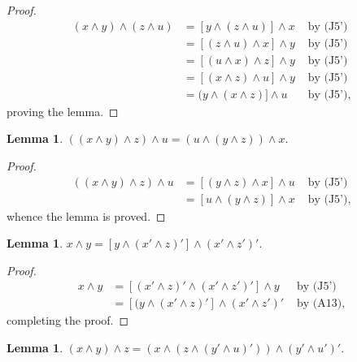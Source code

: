 \documentclass{amsart}
\theoremstyle{plain}
\newtheorem{lemma}[theorem]{Lemma}
\theoremstyle{problem}
\theoremstyle{definition}
\theoremstyle{remark}
\numberwithin{equation}{section}
\begin{document}
\begin{proof}
\begin{align*}                                                            
(x \land y) \land (z \land u)  &= [y \land (z \land u)] \land x &\text{  by (J5')}\\
                                            &= [(z \land u) \land x] \land y  &\text{  by (J5')}\\
                                            &=[(u \land x) \land z] \land y  &\text{  by (J5')}\\
                                            &=[(x \land z)\land u] \land y  &\text{  by (J5')}\\
                                            & =(y \land (x \land z)] \land u &\text{  by (J5')},
\end{align*} 
proving the lemma.                                              
\end{proof}


\begin{lemma} \label{108}
 $((x \land y) \land z) \land u = (u \land (y \land z)) \land x.$  
 \end{lemma}
 
\begin{proof} 
\begin{align*}                                                                 
 ((x \land y) \land z) \land u &= [(y \land z) \land x] \land u &\text{ by (J5')}\\
                                             &= [u \land (y \land z)] \land x &\text{ by (J5')},
 \end{align*} 
 whence the lemma is proved.
 \end{proof}
 
 \begin{lemma} \label{1014} 
   $x \land y = [y \land (x' \land z)'] \land (x' \land z')'.$  
\end{lemma}

\begin{proof}
\begin{align*}
x \land  y &= [(x' \land z)' \land (x' \land z')'] \land y  &\text{ by (J5')}\\
                &= [(y \land (x' \land z)'] \land (x' \land z')'  &\text{ by (A13)},
\end{align*}
completing the proof.
\end{proof}

\begin{lemma} \label{1021}
 $(x \land y) \land z = (x \land (z \land (y' \land u)')) \land (y' \land u')'.$ 
 \end{lemma}
\end{document}

